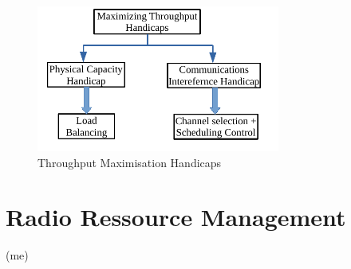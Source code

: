 \documentclass[journal,transmag]{IEEEtran}
\begin{document}
\begin{figure}[t]
\centering
\includegraphics[width=8cm]{Figures/throughput_handicaps.pdf}
\caption{Throughput Maximisation Handicaps}
\label{throughput_handicaps}
\end{figure}

\section{Radio Ressource Management} (me)
\label{RRM_WLAN}
\end{document}
